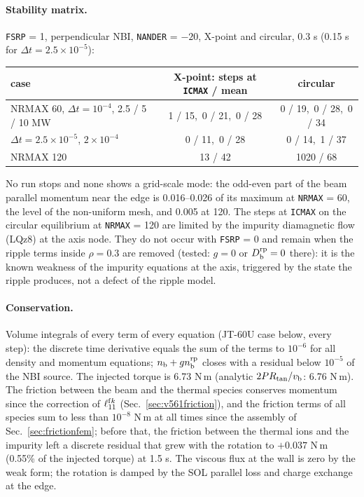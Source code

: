 \documentclass[11pt]{article}
\def\r#1{{\rm#1}}
\def\nb{n_\r{b}}
\def\nbrp{n_\r{b}^\r{rp}}
\def\Dbrp{D_\r{b}^\r{rp}}
\begin{document}
\paragraph{Stability matrix.}  \texttt{FSRP} = 1, perpendicular NBI, \texttt{NANDER} = $-20$,
X-point and circular, 0.3 s (0.15 s for $\Delta t = 2.5\times10^{-5}$):
\begin{center}
\begin{tabular}{|l|c|c|}\hline
case & X-point: steps at \texttt{ICMAX} / mean & circular \\\hline
NRMAX 60, $\Delta t = 10^{-4}$, 2.5 / 5 / 10 MW & 1 / 15,\ 0 / 21,\ 0 / 28 & 0 / 19,\ 0 / 28,\ 0 / 34 \\
$\Delta t = 2.5\times10^{-5}$, $2\times10^{-4}$ & 0 / 11,\ 0 / 28 & 0 / 14,\ 1 / 37 \\
NRMAX 120 & 13 / 42 & 1020 / 68 \\\hline
\end{tabular}
\end{center}
No run stops and none shows a grid-scale mode: the odd-even part of the beam
parallel momentum near the edge is 0.016--0.026 of its maximum at \texttt{NRMAX} = 60,
the level of the non-uniform mesh, and 0.005 at 120.  The steps at \texttt{ICMAX} on
the circular equilibrium at \texttt{NRMAX} = 120 are limited by the impurity
diamagnetic flow (LQz8) at the axis node.  They do not occur with \texttt{FSRP} = 0 and
remain when the ripple terms inside $\rho = 0.3$ are removed (tested: $g = 0$ or
$\Dbrp = 0$ there): it is the known weakness of the impurity equations at the axis,
triggered by the state the ripple produces, not a defect of the ripple model.

\paragraph{Conservation.}  Volume integrals of every term of every equation
(JT-60U case below, every step): the discrete time derivative equals the sum of
the terms to $10^{-6}$ for all density and momentum equations; $\nb+g\nbrp$ closes
with a residual below $10^{-5}$ of the NBI source.  The injected torque is 6.73 N\,m
(analytic $2P R_\r{tan}/v_\r{b}$: 6.76 N\,m).  The friction between the beam and the
thermal species conserves momentum since the correction of $\ell_{11}^{\r{f}k}$
(Sec.~\ref{sec:v561friction}), and the friction terms of all species sum to less
than $10^{-8}$ N\,m at all times since the assembly of Sec.~\ref{sec:frictionfem}; before
that, the friction between the thermal ions and the impurity left a discrete
residual that grew with the rotation to $+0.037$ N\,m (0.55\% of the injected
torque) at 1.5 s.  The viscous flux at the wall is zero by the weak form; the rotation
is damped by the SOL parallel loss and charge exchange at the edge.
\end{document}
